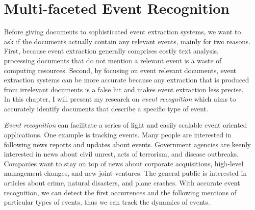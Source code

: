 \chapter{Multi-faceted Event Recognition}
\label{Chapter:Multi-faceted}
Before giving documents to sophisticated event extraction systems, 
we want to ask if the documents actually contain any relevant events,  
mainly for two reasons.
First, because event extraction generally comprises costly text analysis, 
processing documents that do not mention a relevant event 
is 
a waste of computing resources.
Second, by focusing on event relevant documents, event extraction 
systems can be more 
accurate 
because any extraction that is produced 
from irrelevant documents 
is a false hit and 
makes event extraction 
less precise.
In this chapter, I will present my research on {\it event recognition} 
which aims to accurately identify documents that describe a
specific type of event. 

{\it Event recognition} can facilitate a series of light and easily scalable 
event oriented applications. One example is tracking events.
Many people are interested in following news reports and updates about events.
Government agencies are keenly interested in news about civil unrest,
acts of terrorism, and disease outbreaks. Companies want to stay on
top of news about corporate acquisitions, high-level management
changes, and new joint ventures. The general public is interested in
articles about crime, natural disasters, and plane crashes. 
With accurate event recognition, we can detect the first occurrences 
and the following mentions of particular types of events, thus we can 
track the dynamics of 
events. 
